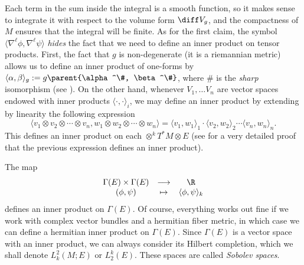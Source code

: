 {\begin{obs}
    Each term in the sum inside the integral is a smooth function, so it makes sense to integrate it with respect to the volume form \(\diff V_g\), and the compactness of \(M\) ensures that the integral will be finite. As for the first claim, the symbol \(\langle \nabla^\ell \phi, \nabla^\ell\psi \rangle\) \textit{hides} the fact that we need to define an inner product on tensor products. First, the fact that \(g\) is non-degenerate (it is a riemannian metric) allows us to define an inner product of one-forms by \(\langle \alpha, \beta\rangle_g:=g\parent{\alpha^\#, \beta^\#}\), where \(\#\) is the \textit{sharp} isomorphism (see \parencite[Ch. 2]{lee_introRM}). On the other hand, whenever \(V_1, \ldots V_n\) are vector spaces endowed with inner products \(\langle\cdot, \cdot \rangle_i\), we may define an inner product by extending by linearity the following expression
    \[
    \langle v_1 \otimes v_2 \otimes \cdots \otimes v_n,  w_1 \otimes w_2 \otimes \cdots \otimes w_n \rangle = \langle v_1, w_1 \rangle_1 \cdot \langle v_2, w_2 \rangle_2 \cdots \langle v_n, w_n \rangle_n.
    \]
    This defines an inner product on each \(\otimes^k T^*M \otimes E\) (see \parencite[Lemma 1.7]{Rusman} for a very detailed proof that the previous expression defines an inner product).
\end{obs}
The map
\[
\begin{array}{ccc}
    \Gamma(E) \times \Gamma(E) & \longrightarrow & \R \\
    (\phi, \psi) & \mapsto & \langle \phi, \psi\rangle_k
\end{array}
\]
defines an inner product on \(\Gamma(E)\). Of course, everything works out fine if we work with complex vector bundles and a hermitian fiber metric, in which case we can define a hermitian inner product on \(\Gamma(E)\). Since \(\Gamma(E)\) is a vector space with an inner product, we can always consider its Hilbert completion, which we shall denote \(L_k^2(M;E)\) or \(L_2^k(E)\). These spaces are called \textit{Sobolev spaces}.
}

